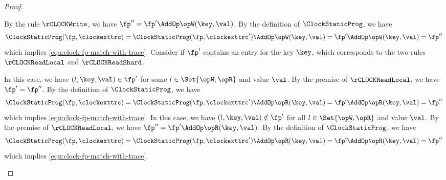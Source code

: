 \begin{toappendix}
\begin{proof}
\begin{enumerate}
    \begin{enumerate}
        By the rule \( \rCLOCKWrite \),
        we have \( \fp'' = \fp' \AddOp \opW(\key,\val)\).
        By the definition of \( \ClockStaticProg \),
        we have 
        \[ 
        \ClockStaticProg(\fp,\clockexttrc) 
                = \ClockStaticProg(\fp,\clockexttrc') \AddOp \opW(\key,\val) 
                = \fp'  \AddOp \opW(\key,\val) = \fp''
        \]
        which implies \cref{equ:clock-fp-match-with-trace}.
        Consider if \( \fp' \) contains an entry for the key \( \key \), 
        which corresponds to the two rules \( \rCLOCKReadLocal\) and \( \rCLOCKReadShard\).
        \begin{enumerate} 
        \Case{\( \rCLOCKReadLocal\)}
            In this case, we have \( (l,\key,\val) \in \fp' \) for some \( l \in \Set{\opW,\opR} \) and value \( \val \).
            By the premise of  \( \rCLOCKReadLocal\),
            we have \( \fp' = \fp''\).
            By the definition of \( \ClockStaticProg \),
            we have 
            \[ 
            \ClockStaticProg(\fp,\clockexttrc) = \ClockStaticProg(\fp,\clockexttrc') \AddOp \opR(\key,\val) 
            = \fp' \AddOp \opR(\key,\val) = \fp''
            \]
            which implies \cref{equ:clock-fp-match-with-trace}.
        \Case{\( \rCLOCKReadShard\)}
            In this case, we have \( (l,\key,\val) \notin \fp' \) for all \( l \in \Set{\opW,\opR} \) and value \( \val \).
            By the premise of  \( \rCLOCKReadLocal\),
            we have \( \fp'' = \fp' \AddOp \opR(\key,\val) \).
            By the definition of \( \ClockStaticProg \),
            we have 
            \[ 
            \ClockStaticProg(\fp,\clockexttrc) = \ClockStaticProg(\fp,\clockexttrc') \AddOp \opR(\key,\val) 
            = \fp' \AddOp \opR(\key,\val) = \fp''
            \]
            which implies \cref{equ:clock-fp-match-with-trace}. \qedhere
        \end{enumerate}
    \end{enumerate}
\end{enumerate}
\end{proof}
\end{toappendix}

